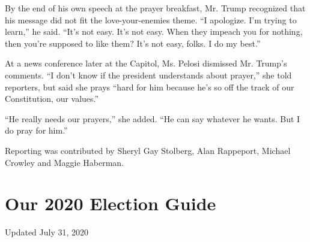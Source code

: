 By the end of his own speech at the prayer breakfast, Mr. Trump
recognized that his message did not fit the love-your-enemies theme. ``I
apologize. I'm trying to learn,'' he said. ``It's not easy. It's not
easy. When they impeach you for nothing, then you're supposed to like
them? It's not easy, folks. I do my best.''

At a news conference later at the Capitol, Ms. Pelosi dismissed Mr.
Trump's comments. ``I don't know if the president understands about
prayer,'' she told reporters, but said she prays ``hard for him because
he's so off the track of our Constitution, our values.''

``He really needs our prayers,'' she added. ``He can say whatever he
wants. But I do pray for him.''

Reporting was contributed by Sheryl Gay Stolberg, Alan Rappeport,
Michael Crowley and Maggie Haberman.

\hypertarget{our-2020-election-guide}{%
\section{Our 2020 Election Guide}\label{our-2020-election-guide}}

Updated July 31, 2020

